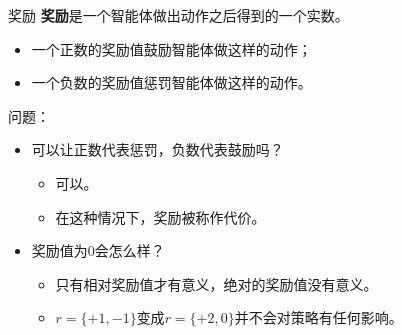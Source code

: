 \begin{frame}{奖励}
    \textbf{奖励}是一个智能体做出动作之后得到的一个实数。
    \begin{itemize}
        \item 一个\alert{正数}的奖励值鼓励智能体做这样的动作；
        \item 一个\alert{负数}的奖励值惩罚智能体做这样的动作。
    \end{itemize}
    问题：
    \begin{itemize}
        \item 可以让正数代表惩罚，负数代表鼓励吗？
        \begin{itemize}
            \item 可以。
            \item 在这种情况下，奖励被称作\alert{代价}。
        \end{itemize}
        \item 奖励值为0会怎么样？
        \begin{itemize}
            \item 只有相对奖励值才有意义，绝对的奖励值没有意义。
            \item $r=\{+1,-1\}$变成$r=\{+2,0\}$并不会对策略有任何影响。
        \end{itemize}
    \end{itemize}
\end{frame}


